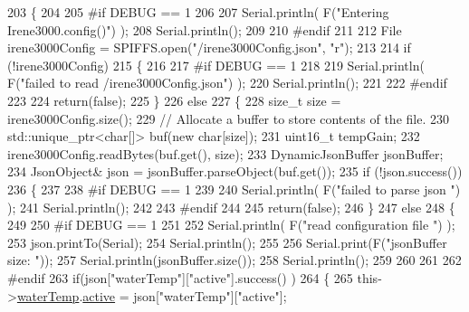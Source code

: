 \begin{DoxyCode}
203 \{
204 
205 \textcolor{preprocessor}{#if DEBUG == 1 }
206 
207     Serial.println( F(\textcolor{stringliteral}{"Entering Irene3000.config()"}) );
208     Serial.println();
209 
210 \textcolor{preprocessor}{#endif}
211 
212     File irene3000Config = SPIFFS.open(\textcolor{stringliteral}{"/irene3000Config.json"}, \textcolor{stringliteral}{"r"});
213 
214     \textcolor{keywordflow}{if} (!irene3000Config) 
215     \{
216     
217 \textcolor{preprocessor}{    #if DEBUG == 1 }
218 
219         Serial.println( F(\textcolor{stringliteral}{"failed to read /irene3000Config.json"}) );
220         Serial.println();
221     
222 \textcolor{preprocessor}{    #endif}
223 
224         \textcolor{keywordflow}{return}(\textcolor{keyword}{false});
225     \}
226     \textcolor{keywordflow}{else}
227     \{
228         \textcolor{keywordtype}{size\_t} size = irene3000Config.size();
229         \textcolor{comment}{// Allocate a buffer to store contents of the file.}
230         std::unique\_ptr<char[]> buf(\textcolor{keyword}{new} \textcolor{keywordtype}{char}[size]);
231             uint16\_t tempGain;
232         irene3000Config.readBytes(buf.get(), size);
233         DynamicJsonBuffer jsonBuffer;
234         JsonObject& json = jsonBuffer.parseObject(buf.get());
235         \textcolor{keywordflow}{if} (!json.success()) 
236         \{
237         
238 \textcolor{preprocessor}{        #if DEBUG == 1 }
239 
240             Serial.println( F(\textcolor{stringliteral}{"failed to parse json "}) );
241             Serial.println();
242         
243 \textcolor{preprocessor}{        #endif}
244             
245             \textcolor{keywordflow}{return}(\textcolor{keyword}{false});
246         \} 
247         \textcolor{keywordflow}{else}
248         \{
249         
250 \textcolor{preprocessor}{        #if DEBUG == 1 }
251     
252             Serial.println( F(\textcolor{stringliteral}{"read configuration file "}) );
253             json.printTo(Serial);
254             Serial.println();
255 
256             Serial.print(F(\textcolor{stringliteral}{"jsonBuffer size: "}));
257             Serial.println(jsonBuffer.size());
258             Serial.println();
259 
260         
261 
262 \textcolor{preprocessor}{        #endif          }
263             \textcolor{keywordflow}{if}(json[\textcolor{stringliteral}{"waterTemp"}][\textcolor{stringliteral}{"active"}].success() )
264             \{           
265                 this->\hyperlink{class_irene3000_af05612c78c758ce9db316c75ad937130}{waterTemp}.\hyperlink{struct_irene3000_1_1state_a879828ace7e7a7bc91ff703bfee36599}{active} = json[\textcolor{stringliteral}{"waterTemp"}][\textcolor{stringliteral}{"active"}]; 

\end{DoxyCode}
